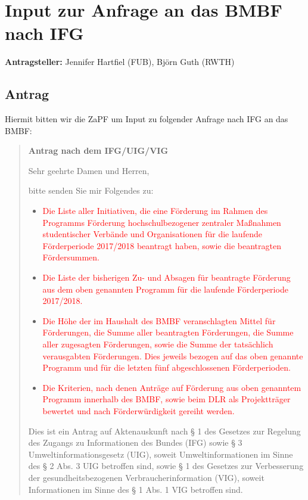 \documentclass[draft,10pt,oneside]{scrartcl}
\begin{document}
\section*{Input zur Anfrage an das BMBF nach IFG}

\textbf{Antragsteller:} Jennifer Hartfiel (FUB), Björn Guth (RWTH)

\subsection*{Antrag}

Hiermit bitten wir die ZaPF um Input zu folgender Anfrage nach IFG an das BMBF:

\begin{quote}
	\textbf{Antrag nach dem IFG/UIG/VIG}

	Sehr geehrte Damen und Herren,

	bitte senden Sie mir Folgendes zu:

	\begin{itemize}
		\item \textcolor{red}{Die Liste aller Initiativen, die eine Förderung
				im Rahmen des Programms \glqq{}Förderung hochschulbezogener
				zentraler Maßnahmen studentischer Verbände und
				Organisationen\grqq{} für die laufende Förderperiode 2017/2018
				beantragt haben, sowie die beantragten Fördersummen.
			}
		\item \textcolor{red}{Die Liste der bisherigen Zu- und Absagen für
				beantragte Förderung aus dem oben genannten Programm für die
				laufende Förderperiode 2017/2018.
			}
		\item \textcolor{red}{Die Höhe der im Haushalt des BMBF veranschlagten
				Mittel für Förderungen, die Summe aller beantragten
				Förderungen, die Summe aller zugesagten Förderungen, sowie die
				Summe der tatsächlich verausgabten Förderungen. Dies jeweils
				bezogen auf das oben genannte Programm und für die letzten fünf
				abgeschlossenen Förderperioden.
			}
		\item \textcolor{red}{Die Kriterien, nach denen Anträge auf Förderung
				aus oben genanntem Programm innerhalb des BMBF, sowie beim DLR
				als Projektträger bewertet und nach Förderwürdigkeit gereiht
				werden.
			}
	\end{itemize}

	Dies ist ein Antrag auf Aktenauskunft nach § 1 des Gesetzes zur Regelung
	des Zugangs zu Informationen des Bundes (IFG) sowie § 3
	Umweltinformationsgesetz (UIG), soweit Umweltinformationen im Sinne des § 2
	Abs. 3 UIG betroffen sind, sowie § 1 des Gesetzes  zur Verbesserung der
	gesundheitsbezogenen Verbraucherinformation (VIG), soweit Informationen im
	Sinne des § 1 Abs. 1 VIG betroffen sind.


\end{quote}
\end{document}
